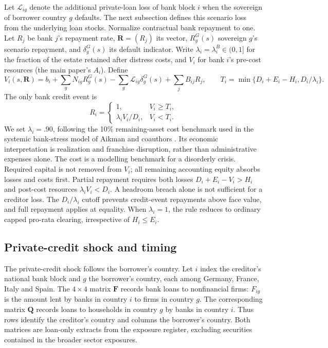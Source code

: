 Let $\mathcal L_{ig}$ denote the additional private-loan loss of bank block $i$ when the sovereign of borrower country $g$ defaults. The next subsection defines this scenario loss from the underlying loan stocks. Normalize contractual bank repayment to one. Let $R_j$ be bank $j$'s repayment rate, $\mathbf{R}=(R_j)$ its vector, $R_g^G(s)$ sovereign $g$'s scenario repayment, and $\delta_g^G(s)$ its default indicator. Write $\lambda_i=\lambda_i^B\in(0,1]$ for the fraction of the estate retained after distress costs, and $V_i$ for bank $i$'s pre-cost resources (the main paper's $A_i$). Define
\[
 V_i(s,\mathbf{R})=b_i+\sum_gN_{ig}R_g^G(s)
          -\sum_g\mathcal L_{ig}\delta_g^G(s)+\sum_jB_{ij}R_j,
 \qquad T_i=\min\{D_i+E_i-H_i,D_i/\lambda_i\}.
\]
The only bank credit event is
\[
 R_i=\begin{cases}1,&V_i\geq T_i,\\
 \lambda_i V_i/D_i,&V_i<T_i.\end{cases}
\]
We set $\lambda_i=.90$, following the 10\% remaining-asset cost benchmark used in the systemic bank-stress model of Aikman and coauthors \citep{Aikman2009}. Its economic interpretation is realization and franchise disruption, rather than administrative expenses alone. The cost is a modelling benchmark for a disorderly crisis. Required capital is not removed from $V_i$; all remaining accounting equity absorbs losses and costs first. Partial repayment requires both losses $D_i+E_i-V_i>H_i$ and post-cost resources $\lambda_iV_i<D_i$. A headroom breach alone is not sufficient for a creditor loss. The $D_i/\lambda_i$ cutoff prevents credit-event repayments above face value, and full repayment applies at equality. When $\lambda_i=1$, the rule reduces to ordinary capped pro-rata clearing, irrespective of $H_i\leq E_i$.

\subsection{Private-credit shock and timing}

The private-credit shock follows the borrower's country. Let $i$ index the creditor's national bank block and $g$ the borrower's country, each among Germany, France, Italy and Spain. The $4\times4$ matrix $\mathbf{F}$ records bank loans to nonfinancial firms: $F_{ig}$ is the amount lent by banks in country $i$ to firms in country $g$. The corresponding matrix $\mathbf{Q}$ records loans to households in country $g$ by banks in country $i$. Thus rows identify the creditor's country and columns the borrower's country. Both matrices are loan-only extracts from the exposure register, excluding securities contained in the broader sector exposures.

